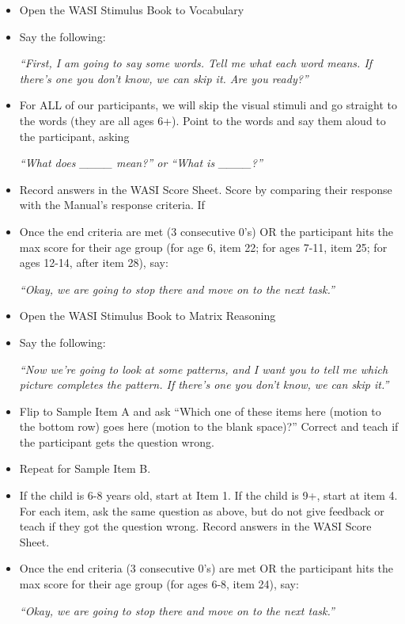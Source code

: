 \documentclass[]{book}
\begin{document}
\begin{itemize}
\item
  Open the WASI Stimulus Book to Vocabulary
\item
  Say the following:

  \emph{``First, I am going to say some words. Tell me what each word means.
  If there's one you don't know, we can skip it. Are you ready?''}
\item
  For ALL of our participants, we will skip the visual stimuli and go straight to the words (they are all ages 6+). Point to the words and say them aloud to the participant, asking

  \emph{``What does \_\_\_\_ mean?'' or ``What is \_\_\_\_?''}
\item
  Record answers in the WASI Score Sheet. Score by comparing their response with the Manual's response criteria. If
\item
  Once the end criteria are met (3 consecutive 0's) OR the participant hits the max score for their age group (for age 6, item 22; for ages 7-11, item 25; for ages 12-14, after item 28), say:

  \emph{``Okay, we are going to stop there and move on to the next task.''}
\item
  Open the WASI Stimulus Book to Matrix Reasoning
\item
  Say the following:

  \emph{``Now we're going to look at some patterns, and I want you to tell me which picture completes the pattern. If there's one you don't know, we can skip it.''}
\item
  Flip to Sample Item A and ask ``Which one of these items here (motion to the bottom row) goes here (motion to the blank space)?'' Correct and teach if the participant gets the question wrong.
\item
  Repeat for Sample Item B.
\item
  If the child is 6-8 years old, start at Item 1. If the child is 9+, start at item 4. For each item, ask the same question as above, but do not give feedback or teach if they got the question wrong. Record answers in the WASI Score Sheet.
\item
  Once the end criteria (3 consecutive 0's) are met OR the participant hits the max score for their age group (for ages 6-8, item 24), say:

  \emph{``Okay, we are going to stop there and move on to the next task.''}
\end{itemize}
\end{document}

